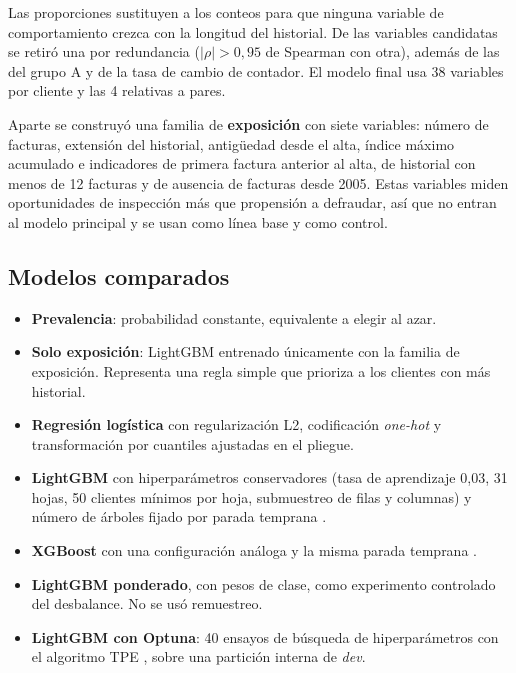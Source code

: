 Las proporciones sustituyen a los conteos para que ninguna variable de comportamiento crezca
con la longitud del historial. De las variables candidatas se retiró una por redundancia
($|\rho| > 0{,}95$ de Spearman con otra), además de las del grupo A y de la tasa de cambio de
contador. El modelo final usa 38 variables por cliente y las 4 relativas a pares.

Aparte se construyó una familia de \textbf{exposición} con siete variables: número de
facturas, extensión del historial, antigüedad desde el alta, índice máximo acumulado e
indicadores de primera factura anterior al alta, de historial con menos de 12 facturas y de
ausencia de facturas desde 2005. Estas variables miden oportunidades de
inspección más que propensión a defraudar, así que no entran al modelo principal y se usan
como línea base y como control.

\subsection{Modelos comparados}

\begin{itemize}
  \item \textbf{Prevalencia}: probabilidad constante, equivalente a elegir al azar.
  \item \textbf{Solo exposición}: LightGBM entrenado únicamente con la familia de exposición.
    Representa una regla simple que prioriza a los clientes con más historial.
  \item \textbf{Regresión logística} con regularización L2, codificación \textit{one-hot} y
    transformación por cuantiles ajustadas en el pliegue.
  \item \textbf{LightGBM} con hiperparámetros conservadores (tasa de aprendizaje 0,03, 31
    hojas, 50 clientes mínimos por hoja, submuestreo de filas y columnas) y número de árboles
    fijado por parada temprana \parencite{ke2017}.
  \item \textbf{XGBoost} con una configuración análoga y la misma parada temprana
    \parencite{chen2016}.
  \item \textbf{LightGBM ponderado}, con pesos de clase, como experimento controlado del
    desbalance. No se usó remuestreo.
  \item \textbf{LightGBM con Optuna}: 40 ensayos de búsqueda de hiperparámetros con el
    algoritmo TPE \parencite{akiba2019}, sobre una partición interna de \textit{dev}.
\end{itemize}

